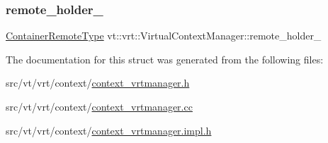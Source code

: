 \subsubsection{\texorpdfstring{remote\+\_\+holder\+\_\+}{remote\_holder\_}}
{\footnotesize\ttfamily \hyperlink{structvt_1_1vrt_1_1_virtual_context_manager_aa0314e4b3f1b39a531c7ba5b630fc72e}{Container\+Remote\+Type} vt\+::vrt\+::\+Virtual\+Context\+Manager\+::remote\+\_\+holder\+\_\+\hspace{0.3cm}{\ttfamily [private]}}



The documentation for this struct was generated from the following files\+:\begin{DoxyCompactItemize}
\item 
src/vt/vrt/context/\hyperlink{context__vrtmanager_8h}{context\+\_\+vrtmanager.\+h}\item 
src/vt/vrt/context/\hyperlink{context__vrtmanager_8cc}{context\+\_\+vrtmanager.\+cc}\item 
src/vt/vrt/context/\hyperlink{context__vrtmanager_8impl_8h}{context\+\_\+vrtmanager.\+impl.\+h}\end{DoxyCompactItemize}
